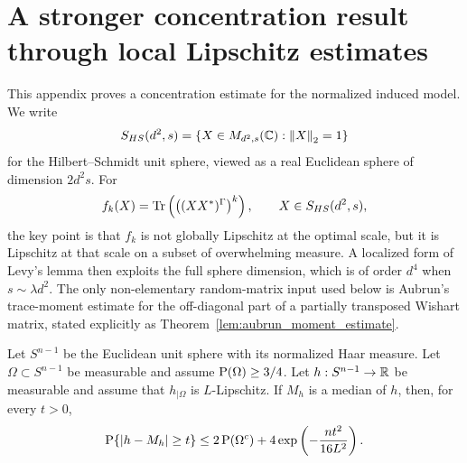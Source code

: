 \section{A stronger concentration result through local Lipschitz estimates}
\label{app:second_approach}

This appendix proves a concentration estimate for the normalized induced model.
We write
\[
    S_{HS}(d^2,s)=\{X\in M_{d^2,s}(\mathbb{C}):\left\lVert X\right\rVert_2=1\}
\]
for the Hilbert--Schmidt unit sphere, viewed as a real Euclidean sphere of
dimension \(2d^2s\).  For
\[
    f_k(X)=\operatorname{Tr}\left(\left((XX^*)^\Gamma\right)^k\right),
    \qquad X\in S_{HS}(d^2,s),
\]
the key point is that \(f_k\) is not globally Lipschitz at the optimal scale,
but it is Lipschitz at that scale on a subset of overwhelming measure.  A
localized form of Levy's lemma then exploits the full sphere dimension,
which is of order \(d^4\) when \(s\sim\lambda d^2\).
The only non-elementary random-matrix input used below is Aubrun's
trace-moment estimate for the off-diagonal part of a partially transposed
Wishart matrix, stated explicitly as Theorem~\ref{lem:aubrun_moment_estimate}.

\begin{lemma}
\label{lem:localized_levy}
Let \(S^{n-1}\) be the Euclidean unit sphere with its normalized Haar
measure.  Let \(\Omega\subset S^{n-1}\) be measurable and assume
\(\operatorname{P}(\Omega)\ge 3/4\).  Let \(h:S^{n-1}\to\mathbb{R}\) be measurable and assume
that \(h_{\mid\Omega}\) is \(L\)-Lipschitz.  If \(M_h\) is a median of \(h\),
then, for every \(t>0\),
\[
    \operatorname{P}\{|h-M_h|\ge t\}
    \le
    2\operatorname{P}(\Omega^c)+4\exp\left(-\frac{nt^2}{16L^2}\right).
\]
\end{lemma}

